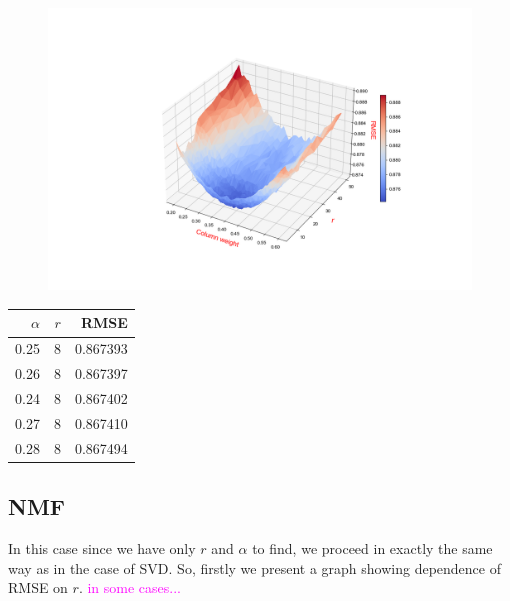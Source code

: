 \documentclass[11pt]{amsart}
\newcommand{\tami}[1]{{\textcolor{magenta}{#1}}}
\begin{document}
\begin{figure}[H]
\includegraphics[scale = 0.45]{svd2_r_w}
\end{figure}

\begin{table}[H]
\begin{tabular}{rrr}
\toprule
$\alpha$ &  $r$ &     RMSE \\
\midrule
\hline
       0.25 &  8 & 0.867393 \\
       0.26 &  8 & 0.867397 \\
       0.24 &  8 & 0.867402 \\
       0.27 &  8 & 0.867410 \\
       0.28 &  8 & 0.867494 \\
\bottomrule
\end{tabular}
\end{table}

\subsection*{NMF}

In this case since we have only $r$ and $\alpha$ to find, we proceed in exactly the same way as in the case of SVD.
So, firstly we present a graph showing dependence of RMSE on $r$. \tami{in some cases...}
\end{document}
